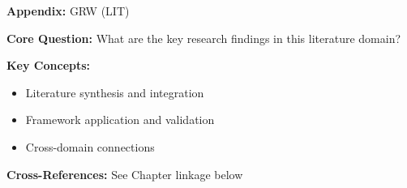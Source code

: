 
\begin{tcolorbox}[colback=blue!5!white, colframe=blue!75!black,
    title=Quick Reference: Appendix UNMAPPED_GRW]
\textbf{Appendix:} GRW (LIT)

\textbf{Core Question:} What are the key research findings in this literature domain?

\textbf{Key Concepts:}
\begin{itemize}[nosep]
\item Literature synthesis and integration
\item Framework application and validation
\item Cross-domain connections
\end{itemize}

\textbf{Cross-References:} See Chapter linkage below
\end{tcolorbox}


\begin{abstract}
This appendix provides a systematic review and integration of key research findings
in the LIT domain. It synthesizes literature relevant to the Evidence-Based
Framework (EBF) and identifies connections to the 10C CORE architecture.
\end{abstract}



